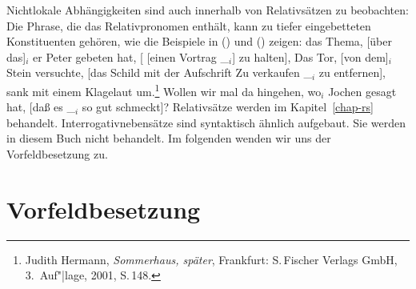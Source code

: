 Nichtlokale Abhängigkeiten sind auch innerhalb von Relativsätzen zu beobachten: Die Phrase, die
das Relativpronomen enthält, kann zu tiefer eingebetteten Konstituenten gehören, wie die
Beispiele in () und () zeigen:
\eal
\label{bsp-nla-rs}
\ex{}
das Thema, [über das]$_i$ er Peter gebeten hat, [ [einen Vortrag \_$_i$] zu halten],
\ex{} 
Das Tor, [von dem]$_i$ Stein versuchte, [das Schild mit der Aufschrift \frqq Zu verkaufen\flqq{} \_$_i$ zu entfernen], sank mit einem
Klagelaut um.\footnote{
  Judith Hermann, \emph{Sommerhaus, später}, Frankfurt: S.\,Fischer Verlags GmbH, 3.\, Auf"|lage, 2001, S.\,148.%
}
\zl
\ea
Wollen wir mal da hingehen, wo$_i$ Jochen gesagt hat, [daß es \_$_i$ so gut schmeckt]?
\z{}
Relativsätze werden im Kapitel~\ref{chap-rs} behandelt. Interrogativnebensätze sind syntaktisch ähnlich aufgebaut.
Sie werden in diesem Buch nicht behandelt. Im folgenden wenden wir uns der Vorfeldbesetzung zu.


\section{Vorfeldbesetzung}

